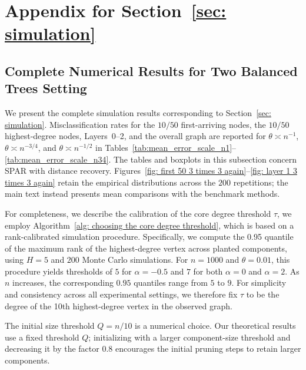\documentclass[twoside,11pt]{article}
\theoremstyle{remark}
\begin{document}
\newpage
\section{Appendix for Section~\ref{sec: simulation}}
\subsection{Complete Numerical Results for Two Balanced Trees Setting}
\label{sec: complete simulation}
We present the complete simulation results corresponding to Section~\ref{sec: simulation}. Misclassification rates for the $10/50$ first-arriving nodes, the $10/50$ highest-degree nodes, Layers~0--2, and the overall graph are reported for $\theta \asymp n^{-1}$, $\theta \asymp n^{-3/4}$, and $\theta \asymp n^{-1/2}$ in Tables~\ref{tab:mean_error_scale_n1}--\ref{tab:mean_error_scale_n34}. 
The tables and boxplots in this subsection concern SPAR with distance recovery. Figures~\ref{fig: first 50 3 times 3 again}--\ref{fig: layer 1 3 times 3 again} retain the empirical distributions across the $200$ repetitions; the main text instead presents mean comparisons with the benchmark methods.

For completeness, we describe the calibration of the core degree threshold $\tau$, we employ Algorithm~\ref{alg: choosing the core degree threshold}, which is based on a rank-calibrated simulation procedure.
Specifically, we compute the 0.95 quantile of the maximum rank of the highest-degree vertex across planted components, using $H=5$ and $200$ Monte Carlo simulations.
For $n=1000$ and $\theta=0.01$, this procedure yields thresholds of $5$ for $\alpha=-0.5$ and $7$ for both $\alpha=0$ and $\alpha=2$. As $n$ increases, the corresponding $0.95$ quantiles range from $5$ to $9$.
For simplicity and consistency across all experimental settings, we therefore fix $\tau$ to be the degree of the 10th highest-degree vertex in the observed graph.

The initial size threshold $Q=n/10$ is a numerical choice. Our theoretical results use a fixed threshold $Q$; initializing with a larger component-size threshold and decreasing it by the factor $0.8$ encourages the initial pruning steps to retain larger components.
\end{document}
